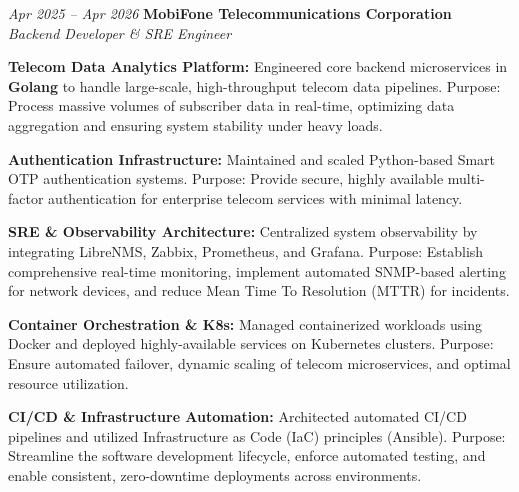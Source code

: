 \begin{twocolentry}{\textit{Apr 2025 -- Apr 2026}}
    \textbf{MobiFone Telecommunications Corporation} \\[4pt]
    \textit{Backend Developer \& SRE Engineer}
\end{twocolentry}
\begin{onecolentry}
    \begin{highlights}
        \item \textbf{Telecom Data Analytics Platform:} Engineered core backend microservices in \textbf{Golang} to handle large-scale, high-throughput telecom data pipelines. Purpose: Process massive volumes of subscriber data in real-time, optimizing data aggregation and ensuring system stability under heavy loads.
        \item \textbf{Authentication Infrastructure:} Maintained and scaled Python-based Smart OTP authentication systems. Purpose: Provide secure, highly available multi-factor authentication for enterprise telecom services with minimal latency.
        \item \textbf{SRE \& Observability Architecture:} Centralized system observability by integrating LibreNMS, Zabbix, Prometheus, and Grafana. Purpose: Establish comprehensive real-time monitoring, implement automated SNMP-based alerting for network devices, and reduce Mean Time To Resolution (MTTR) for incidents.
        \item \textbf{Container Orchestration \& K8s:} Managed containerized workloads using Docker and deployed highly-available services on Kubernetes clusters. Purpose: Ensure automated failover, dynamic scaling of telecom microservices, and optimal resource utilization.
        \item \textbf{CI/CD \& Infrastructure Automation:} Architected automated CI/CD pipelines and utilized Infrastructure as Code (IaC) principles (Ansible). Purpose: Streamline the software development lifecycle, enforce automated testing, and enable consistent, zero-downtime deployments across environments.
    \end{highlights}
\end{onecolentry}
\vspace{0.2 cm}

